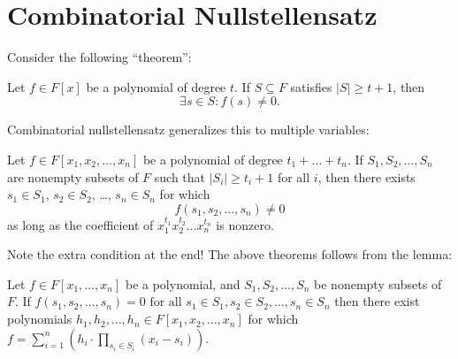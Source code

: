 \documentclass[11pt]{scrartcl}
\begin{document}
\section{Combinatorial Nullstellensatz}
\setcounter{theorem}{-1}
Consider the following ``theorem'':
\begin{theorem}
  Let $f \in F[x]$ be a polynomial of degree $t$.  If $S \subseteq F$ satisfies $\left\lvert S \right\rvert \ge t+1$, then \[ \exists s \in S: f(s) \neq 0. \]
\end{theorem}
Combinatorial nullstellensatz generalizes this to multiple variables:
\begin{theorem}
  Let $f \in F[x_1, x_2, \dots, x_n]$ be a polynomial of degree $t_1 + \dots + t_n$.  If $S_1, S_2, \dots, S_n$ are nonempty subsets of $F$ such that $\left\lvert S_i \right\rvert \ge t_i + 1$ for all $i$, then there exists $s_1 \in S_1$, $s_2 \in S_2$, \dots, $s_n \in S_n$ for which \[ f(s_1, s_2, \dots, s_n) \neq 0 \]
  as long as the coefficient of $x_1^{t_1}x_2^{t_2}\dots x_n^{t_n}$ is nonzero.
\end{theorem}
Note the extra condition at the end!  The above theorems follows from the lemma:
\begin{lemma}
  Let $f \in F[x_1, \dots, x_n]$ be a polynomial, and $S_1, S_2, \dots, S_n$ be nonempty subsets of $F$.  If $f(s_1, s_2, \dots, s_n) = 0 \text{ for all } s_1 \in S_1, s_2 \in S_2, \dots, s_n \in S_n$ then there exist polynomials $h_1, h_2, \dots, h_n \in F[x_1, x_2, \dots, x_n]$ for which $f = \sum_{i=1}^n \left( h_i \cdot \prod_{s_i \in S_i} (x_i-s_i) \right)$.
\end{lemma}
\end{document}
